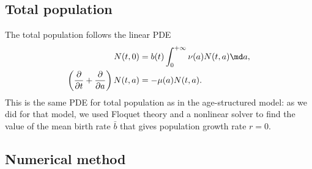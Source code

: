 \documentclass{jpmarticle}
\begin{document}
\subsection{Total population}

The total population follows the linear PDE
\begin{equation}
  \begin{split}
    N(t, 0) &=
    b(t) \int_0^{+\infty} \nu(a) N(t, a) \md a,
    \\
    \left(\frac{\partial}{\partial t}
      + \frac{\partial}{\partial a}\right)
    N(t, a) &=
    - \mu(a) N(t, a).
  \end{split}
\end{equation}
This is the same PDE for total population as in the age-structured
model: as we did for that model, we used Floquet theory and a
nonlinear solver to find the value of the mean birth rate $\bar{b}$
that gives population growth rate $r = 0$.


\subsection{Numerical method}
\end{document}
